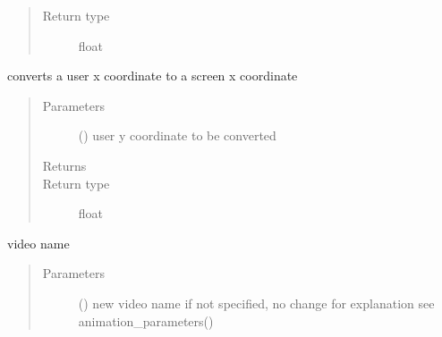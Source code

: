 \documentclass[letterpaper,10pt,english]{sphinxmanual}
\begin{document}
\begin{fulllineitems}
\begin{fulllineitems}
\begin{quote}
\begin{description}
\item[{Return type}] \leavevmode
float

\end{description}\end{quote}

\end{fulllineitems}


\begin{fulllineitems}
\label{\detokenize{Reference:salabim.Environment.user_to_screencoordinates_y}}
converts a user x coordinate to a screen x coordinate
\begin{quote}\begin{description}
\item[{Parameters}] \leavevmode
{} () \textendash{} user y coordinate to be converted

\item[{Returns}] \leavevmode
{}

\item[{Return type}] \leavevmode
float

\end{description}\end{quote}

\end{fulllineitems}


\begin{fulllineitems}
\label{\detokenize{Reference:salabim.Environment.video}}
video name
\begin{quote}\begin{description}
\item[{Parameters}] \leavevmode
{} (\sphinxstyleliteralemphasis{\sphinxupquote{, }}) \textendash{} new video name 
if not specified, no change 
for explanation see animation\_parameters()


\end{description}
\end{quote}
\end{fulllineitems}
\end{fulllineitems}
\end{document}

